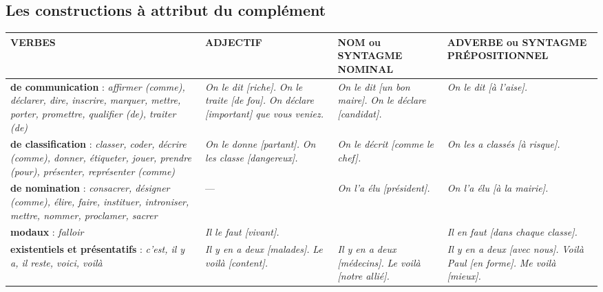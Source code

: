 \documentclass[UTF8]{report}
\begin{document}
\subsection{Les constructions à attribut du complément}
\begin{tabular}{|p{4cm}|p{3.5cm}|p{3.5cm}|>{\RaggedRight\arraybackslash}p{3.5cm}|}
\hline
\textbf{VERBES} & \textbf{ADJECTIF} & \textbf{NOM ou SYNTAGME NOMINAL} & \textbf{ADVERBE ou SYNTAGME PRÉPOSITIONNEL} \\
\hline
\textbf{de communication} : \newline \textit{affirmer (comme), déclarer, \newline dire, inscrire, marquer, \newline mettre, porter, promettre, \newline qualifier (de), traiter (de)} & \textit{On le dit [riche].} \newline \textit{On le traite [de fou].} \newline \textit{On déclare [important] que vous veniez.} & \textit{On le dit [un bon maire].} \newline \textit{On le déclare [candidat].} & \textit{On le dit [à l'aise].} \\
\hline
\textbf{de classification} : \newline \textit{classer, coder, \newline décrire (comme), \newline donner, étiqueter, jouer, \newline prendre (pour), présenter, \newline représenter (comme)} & \textit{On le donne [partant].} \newline \textit{On les classe [dangereux].} & \textit{On le décrit [comme le chef].} & \textit{On les a classés [à risque].} \\
\hline
\textbf{de nomination} : \newline \textit{consacrer, désigner (comme), \newline élire, faire, instituer, introniser, \newline mettre, nommer, proclamer, \newline sacrer} & \quad --- & \textit{On l'a élu [président].} & \textit{On l'a élu [à la mairie].} \\
\hline
\textbf{modaux} : \newline \textit{falloir} & \textit{Il le faut [vivant].} & & \textit{Il en faut [dans chaque classe].} \\
\hline
\textbf{existentiels et présentatifs} : \newline \textit{c'est, il y a, il reste, voici, \newline voilà} & \textit{Il y en a deux [malades].} \newline \textit{Le voilà [content].} & \textit{Il y en a deux [médecins].} \newline \textit{Le voilà [notre allié].} & \textit{Il y en a deux [avec nous].} \newline \textit{Voilà Paul [en forme].} \newline \textit{Me voilà [mieux].} \\

\end{tabular}
\end{document}
